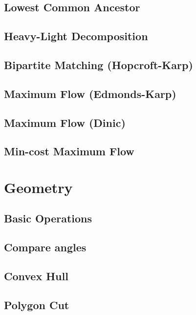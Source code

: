 \documentclass[10pt,landscape,a4paper,twocolumn]{article}
\begin{document}
\subsection{Lowest Common Ancestor}


\subsection{Heavy-Light Decomposition}

\subsection{Bipartite Matching (Hopcroft-Karp)}


\subsection{Maximum Flow (Edmonds-Karp)}

\subsection{Maximum Flow (Dinic)}

\subsection{Min-cost Maximum Flow}


\section{Geometry}

\subsection{Basic Operations}

\subsection{Compare angles}

\subsection{Convex Hull}


\subsection{Polygon Cut}
\end{document}
